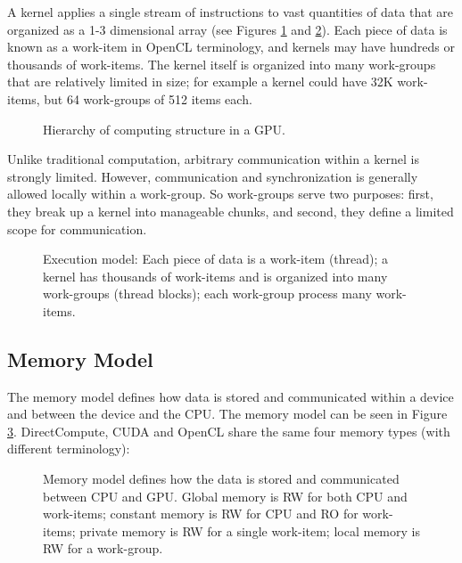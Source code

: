 \documentclass[prodmode,acmtecs]{acmsmall}
\begin{document}
A kernel applies a single stream of instructions to vast quantities of data that are organized as a 1-3 dimensional array (see Figures \ref{figure:captura1paperCEC} and \ref{figure:grid}). Each piece of data is known as a work-item in OpenCL terminology, and kernels may have hundreds or thousands of work-items. The kernel itself is organized into many work-groups that are relatively limited in size; for example a kernel could have 32K work-items, but 64 work-groups of 512 items each. 

\begin{figure}[h]
\centerline{}
\caption{Hierarchy of computing structure in a GPU.}
\label{figure:captura1paperCEC}
\end{figure}

Unlike traditional computation, arbitrary communication within a kernel is strongly limited. However, communication and synchronization is generally allowed locally within a work-group. So work-groups serve two purposes: first, they break up a kernel into manageable chunks, and second, they define a limited scope for communication. 

\begin{figure}[h]
\centerline{}
\caption{Execution model: Each piece of data is a work-item (thread); a kernel has thousands of work-items and is organized into many work-groups (thread blocks); each work-group process many work-items.}
\label{figure:grid}
\end{figure}

\subsection{Memory Model}

The memory model defines how data is stored and communicated within a device and between the device and the CPU. The memory model can be seen in Figure \ref{figure:memory}. DirectCompute, CUDA and OpenCL share the same four memory types (with different terminology):

\begin{figure}
\centerline{}
\caption{Memory model defines how the data is stored and communicated between CPU and GPU. Global memory is RW for both CPU and work-items; constant memory is RW for CPU and RO for work-items; private memory is RW for a single work-item; local memory is RW for a work-group.}
\label{figure:memory}
\end{figure}
\end{document}
